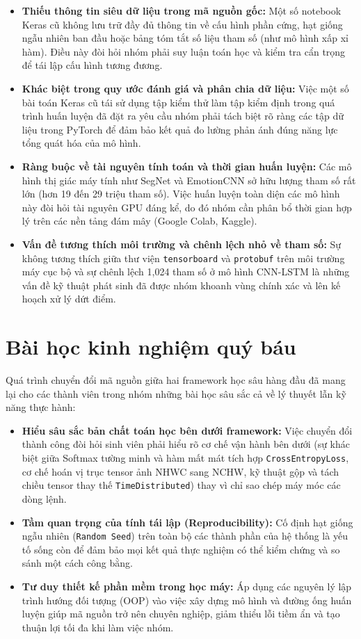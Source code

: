 \begin{itemize}
\item \textbf{Thiếu thông tin siêu dữ liệu trong mã nguồn gốc:} Một số notebook Keras cũ không lưu trữ đầy đủ thông tin về cấu hình phần cứng, hạt giống ngẫu nhiên ban đầu hoặc bảng tóm tắt số liệu tham số (như mô hình xấp xỉ hàm). Điều này đòi hỏi nhóm phải suy luận toán học và kiểm tra cẩn trọng để tái lập cấu hình tương đương.
\item \textbf{Khác biệt trong quy ước đánh giá và phân chia dữ liệu:} Việc một số bài toán Keras cũ tái sử dụng tập kiểm thử làm tập kiểm định trong quá trình huấn luyện đã đặt ra yêu cầu nhóm phải tách biệt rõ ràng các tập dữ liệu trong PyTorch để đảm bảo kết quả đo lường phản ánh đúng năng lực tổng quát hóa của mô hình.
\item \textbf{Ràng buộc về tài nguyên tính toán và thời gian huấn luyện:} Các mô hình thị giác máy tính như SegNet và EmotionCNN sở hữu lượng tham số rất lớn (hơn 19 đến 29 triệu tham số). Việc huấn luyện toàn diện các mô hình này đòi hỏi tài nguyên GPU đáng kể, do đó nhóm cần phân bổ thời gian hợp lý trên các nền tảng đám mây (Google Colab, Kaggle).
\item \textbf{Vấn đề tương thích môi trường và chênh lệch nhỏ về tham số:} Sự không tương thích giữa thư viện \texttt{tensorboard} và \texttt{protobuf} trên môi trường máy cục bộ và sự chênh lệch 1,024 tham số ở mô hình CNN-LSTM là những vấn đề kỹ thuật phát sinh đã được nhóm khoanh vùng chính xác và lên kế hoạch xử lý dứt điểm.
\end{itemize}

\section{Bài học kinh nghiệm quý báu}
Quá trình chuyển đổi mã nguồn giữa hai framework học sâu hàng đầu đã mang lại cho các thành viên trong nhóm những bài học sâu sắc cả về lý thuyết lẫn kỹ năng thực hành:
\begin{itemize}
\item \textbf{Hiểu sâu sắc bản chất toán học bên dưới framework:} Việc chuyển đổi thành công đòi hỏi sinh viên phải hiểu rõ cơ chế vận hành bên dưới (sự khác biệt giữa Softmax tường minh và hàm mất mát tích hợp \texttt{CrossEntropyLoss}, cơ chế hoán vị trục tensor ảnh NHWC sang NCHW, kỹ thuật gộp và tách chiều tensor thay thế \texttt{TimeDistributed}) thay vì chỉ sao chép máy móc các dòng lệnh.
\item \textbf{Tầm quan trọng của tính tái lập (Reproducibility):} Cố định hạt giống ngẫu nhiên (\texttt{Random Seed}) trên toàn bộ các thành phần của hệ thống là yếu tố sống còn để đảm bảo mọi kết quả thực nghiệm có thể kiểm chứng và so sánh một cách công bằng.
\item \textbf{Tư duy thiết kế phần mềm trong học máy:} Áp dụng các nguyên lý lập trình hướng đối tượng (OOP) vào việc xây dựng mô hình và đường ống huấn luyện giúp mã nguồn trở nên chuyên nghiệp, giảm thiểu lỗi tiềm ẩn và tạo thuận lợi tối đa khi làm việc nhóm.
\end{itemize}

